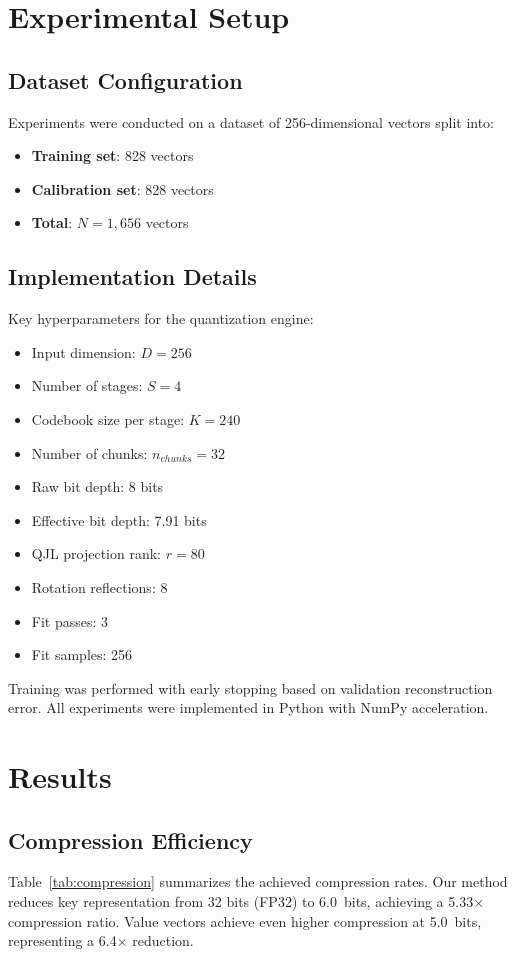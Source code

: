 \documentclass[10pt,conference]{ieeeconf}
\begin{document}
\section{Experimental Setup}

\subsection{Dataset Configuration}
Experiments were conducted on a dataset of 256-dimensional vectors split into:
\begin{itemize}
    \item \textbf{Training set}: 828 vectors
    \item \textbf{Calibration set}: 828 vectors
    \item \textbf{Total}: $N = 1,656$ vectors
\end{itemize}

\subsection{Implementation Details}
Key hyperparameters for the quantization engine:
\begin{itemize}
    \item Input dimension: $D = 256$
    \item Number of stages: $S = 4$
    \item Codebook size per stage: $K = 240$
    \item Number of chunks: $n_{chunks} = 32$
    \item Raw bit depth: 8 bits
    \item Effective bit depth: 7.91 bits
    \item QJL projection rank: $r = 80$
    \item Rotation reflections: 8
    \item Fit passes: 3
    \item Fit samples: 256
\end{itemize}

Training was performed with early stopping based on validation reconstruction error. All experiments were implemented in Python with NumPy acceleration.

\section{Results}

\subsection{Compression Efficiency}
Table~\ref{tab:compression} summarizes the achieved compression rates. Our method reduces key representation from 32 bits (FP32) to \SI{6.0}{bits}, achieving a 5.33$\times$ compression ratio. Value vectors achieve even higher compression at \SI{5.0}{bits}, representing a 6.4$\times$ reduction.
\end{document}
